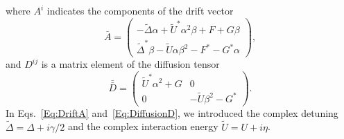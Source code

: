 where $A^i$ indicates the components of the drift vector
\begin{equation}\label{Eq:DriftA}
\bar{A}=
\begin{pmatrix}
-\widetilde{\Delta} \alpha + \widetilde{U}^* \alpha^2 \beta + F + G \beta \\
\widetilde{\Delta}^* \beta - \widetilde{U} \alpha \beta^2 -F^* -G^* \alpha
\end{pmatrix},
\end{equation}
and $D^{ij}$ is a matrix element of the diffusion tensor
\begin{equation}\label{Eq:DiffusionD}
\bar{\bar{D}}=
\begin{pmatrix}
\widetilde{U}^* \alpha^2 + G & 0 \\
0 & -\widetilde{U} \beta^2 -G^*
\end{pmatrix}.
\end{equation}
In Eqs.~\eqref{Eq:DriftA} and~\eqref{Eq:DiffusionD}, we introduced the complex detuning $\widetilde{\Delta}=\Delta+ i \gamma/2$ and the complex interaction energy $\widetilde{U}=U+ i \eta$.


